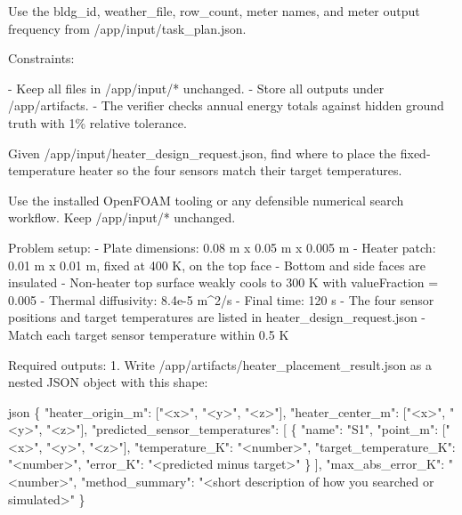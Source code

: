 \documentclass{llmxive}
\begin{document}
\begin{instructionbox}
Use the \textasciigrave{}bldg\_id\textasciigrave{}, \textasciigrave{}weather\_file\textasciigrave{}, \textasciigrave{}row\_count\textasciigrave{}, meter names, and meter output frequency from \textasciigrave{}/app/input/task\_plan.json\textasciigrave{}.

Constraints:

- Keep all files in \textasciigrave{}/app/input/*\textasciigrave{} unchanged.
- Store all outputs under \textasciigrave{}/app/artifacts\textasciigrave{}.
- The verifier checks annual energy totals against hidden ground truth with \textasciigrave{}1\%\textasciigrave{} relative tolerance.
\end{instructionbox}

\begin{instructionbox}
Given \textasciigrave{}/app/input/heater\_design\_request.json\textasciigrave{}, find where to place the fixed-temperature heater so the four sensors match their target temperatures.

Use the installed OpenFOAM tooling or any defensible numerical search workflow. Keep \textasciigrave{}/app/input/*\textasciigrave{} unchanged.

Problem setup:
- Plate dimensions: \textasciigrave{}0.08 m x 0.05 m x 0.005 m\textasciigrave{}
- Heater patch: \textasciigrave{}0.01 m x 0.01 m\textasciigrave{}, fixed at \textasciigrave{}400 K\textasciigrave{}, on the top face
- Bottom and side faces are insulated
- Non-heater top surface weakly cools to \textasciigrave{}300 K\textasciigrave{} with \textasciigrave{}valueFraction = 0.005\textasciigrave{}
- Thermal diffusivity: \textasciigrave{}8.4e-5 m\textasciicircum{}2/s\textasciigrave{}
- Final time: \textasciigrave{}120 s\textasciigrave{}
- The four sensor positions and target temperatures are listed in \textasciigrave{}heater\_design\_request.json\textasciigrave{}
- Match each target sensor temperature within \textasciigrave{}0.5 K\textasciigrave{}

Required outputs:
1. Write \textasciigrave{}/app/artifacts/heater\_placement\_result.json\textasciigrave{} as a nested JSON object with this shape:

\textasciigrave{}\textasciigrave{}\textasciigrave{}json
\{
  "heater\_origin\_m": ["\textless{}x\textgreater{}", "\textless{}y\textgreater{}", "\textless{}z\textgreater{}"],
  "heater\_center\_m": ["\textless{}x\textgreater{}", "\textless{}y\textgreater{}", "\textless{}z\textgreater{}"],
  "predicted\_sensor\_temperatures": [
    \{
      "name": "S1",
      "point\_m": ["\textless{}x\textgreater{}", "\textless{}y\textgreater{}", "\textless{}z\textgreater{}"],
      "temperature\_K": "\textless{}number\textgreater{}",
      "target\_temperature\_K": "\textless{}number\textgreater{}",
      "error\_K": "\textless{}predicted minus target\textgreater{}"
    \}
  ],
  "max\_abs\_error\_K": "\textless{}number\textgreater{}",
  "method\_summary": "\textless{}short description of how you searched or simulated\textgreater{}"
\}
\textasciigrave{}\textasciigrave{}\textasciigrave{}


\end{instructionbox}
\end{document}
